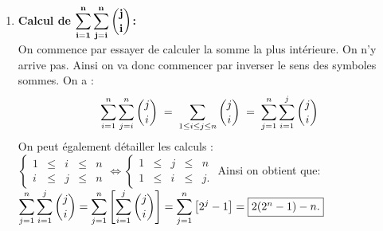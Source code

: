 \documentclass[a4paper, 11pt,reqno]{article}
\begin{document}
\begin{correction}
\begin{enumerate}
\begin{itemize}
\end{itemize}
\item  \textbf{Calcul de $\mathbf{\displaystyle \sum\limits_{i=1}^n\displaystyle \sum\limits_{j=i}^n \binom{j}{i}}$:}\\
\noindent On commence par essayer de calculer la somme la plus int\'erieure. On n'y arrive pas. Ainsi on va donc commencer par inverser le sens des symboles sommes. On a :
$$\sum\limits_{i=1}^n\displaystyle \sum\limits_{j=i}^n \binom{j}{i} \;=\; \sum\limits_{1\leq i \leq j \leq n} \binom{j}{i} \;=\;\displaystyle \sum\limits_{j=1}^n\displaystyle \sum\limits_{i=1}^j \binom{j}{i}$$
On peut \'egalement d\'etailler les calculs :
$\left\lbrace \begin{array}{lllll}
1 & \leq & i & \leq & n\\
i & \leq & j & \leq & n
\end{array}\right.
\Longleftrightarrow
\left\lbrace \begin{array}{lllll}
1 & \leq &j & \leq & n\\
1 & \leq & i & \leq & j.
\end{array}\right.
$
Ainsi on obtient que: 
$\displaystyle \sum\limits_{j=1}^n\displaystyle \sum\limits_{i=1}^j \binom{j}{i}=
\displaystyle \sum\limits_{j=1}^n \left\lbrack  \displaystyle \sum\limits_{i=1}^j \binom{j}{i}  \right\rbrack=
\displaystyle \sum\limits_{j=1}^n \left\lbrack 2^j-1 \right\rbrack=\fbox{$2(2^n-1)-n.$}
$
\end{enumerate}
\end{correction}










\end{document}
